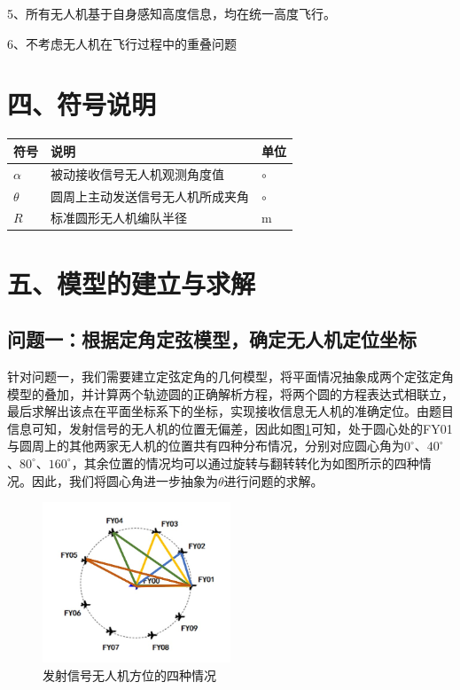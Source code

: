\documentclass{my_paper}
\begin{document}
5、所有无人机基于自身感知高度信息，均在统一高度飞行。

6、不考虑无人机在飞行过程中的重叠问题


\section{四、符号说明}
\begin{table}[h]%
    \centering
    \begin{tabular}{p{2.0cm}<{\centering}p{9.0cm}<{\centering}p{2.0cm}<{\centering}}
        \hline
        符号     & 说明                             & 单位    \\ %
        \hline
        $\alpha$ & 被动接收信号无人机观测角度值     & $\circ$ \\ %
        $\theta$ & 圆周上主动发送信号无人机所成夹角 & $\circ$ \\ %
        $R$ & 标准圆形无人机编队半径 & m\\
        \hline
    \end{tabular}
\end{table}


\section{五、模型的建立与求解}




\subsection{问题一：根据定角定弦模型，确定无人机定位坐标}
针对问题一，我们需要建立定弦定角的几何模型，将平面情况抽象成两个定弦定角模型的叠加，并计算两个轨迹圆的正确解析方程，将两个圆的方程表达式相联立，最后求解出该点在平面坐标系下的坐标，实现接收信息无人机的准确定位。由题目信息可知，发射信号的无人机的位置无偏差，因此如图\ref{sizhong}可知，处于圆心处的FY01与圆周上的其他两家无人机的位置共有四种分布情况，分别对应圆心角为$0^{\circ}$、$40^{\circ}$、$80^{\circ}$、$160^{\circ}$，其余位置的情况均可以通过旋转与翻转转化为如图所示的四种情况。因此，我们将圆心角进一步抽象为$\theta$进行问题的求解。


\begin{figure}[h]
    \centering
    \includegraphics[width=0.5\textwidth]{images/sizhong.jpg}
    \caption{发射信号无人机方位的四种情况}
    \label{sizhong}
\end{figure}
\end{document}
